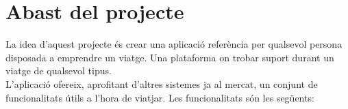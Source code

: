 
\chapter{Abast del projecte} %

\label{Abast} %

La idea d’aquest projecte és crear una aplicació referència per qualsevol persona disposada a emprendre un viatge. Una plataforma on trobar suport durant un viatge de qualsevol tipus.\\

L’aplicació ofereix, aprofitant d’altres sistemes ja al mercat, un conjunt de funcionalitats útils a l’hora de viatjar. Les funcionalitats són les següents:
